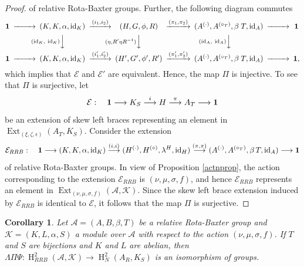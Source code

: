 \documentclass[11pt]{amsart}
\theoremstyle{thrm}
\theoremstyle{plain}
\newtheorem{cor}[thm]{Corollary}
\theoremstyle{definition}
\newcommand{\Ho}{\operatorname{H} }
\newcommand{\Id}{\operatorname{id}}
\newcommand{\Ext}{\operatorname{Ext} }
\numberwithin{equation}{section}
\begin{document}
\begin{proof}
of relative Rota-Baxter groups.  Further, the following diagram commutes 
		\begin{align}
			\begin{CD}\label{eqact1}
				{\bf 1} @>>> (K,K,\alpha,\Id_K) @>(i_1, i_2)>> (H,G, \phi, R) @>{{(\pi_1, \pi_2)} }>> (A^{(\cdot)},A^{(\circ_T)}, \beta \; T, \Id_A) @>>> {\bf 1}\\ 
				&& @V{(\Id_K, ~\Id_K)} VV@V{(\eta, R^\prime \eta R^{-1})} VV @V{(\Id_A, ~\Id_A)}VV \\
				{\bf 1} @>>> (K,K,\alpha,\Id_K) @>(i^\prime_1, i^\prime_2)>>(H^\prime,G^\prime, \phi^\prime, R^\prime) @>{(\pi^\prime_1, \pi^\prime_2) }>> (A^{(\cdot)},A^{(\circ_T)}, \beta \; T, \Id_A) @>>> {\bf 1},
			\end{CD}
		\end{align}
which implies that $\mathcal{E}$ and $\mathcal{E}'$ are equivalent. Hence, the map $\Pi$ is injective. To see that $\Pi$ is surjective, let $$\mathcal{E}: \quad {\bf 1} \longrightarrow K_S \stackrel{i}{\longrightarrow}  H \stackrel{\pi}{\longrightarrow} A_T \longrightarrow {\bf 1}$$
be an extension of skew left braces representing an element in $ \Ext_{(\xi, \zeta, \epsilon)}(A_T, K_S)$. Consider the extension 
$$\mathcal{E}_{RRB} : \quad  {\bf 1} \longrightarrow (K, K, \alpha , \Id_K) \stackrel{(i, i)}{\longrightarrow}  (H^{(\cdot)}, H^{(\circ)}, \lambda^H, \Id_H) \stackrel{(\pi, \pi)}{\longrightarrow} (A^{(\cdot)}, A^{(\circ_T)}, \beta \, T, \Id_A) \longrightarrow {\bf 1}$$ of relative Rota-Baxter groups. In view of Proposition \ref{actnprop}, the action corresponding to the extension $\mathcal{E}_{RRB}$ is $(\nu, \mu, \sigma, f)$, and hence $\mathcal{E}_{RRB}$ represents an element in $ \Ext_{(\nu, \mu, \sigma, f)}(\mathcal{A}, \mathcal{K})$. Since the skew left brace extension induced by $\mathcal{E}_{RRB}$ is identical to $\mathcal{E}$, it follows that the map $\Pi$ is surjective. 
\end{proof}

\begin{cor}\label{isomorphism RRB and SLB cohomology}
Let $\mathcal{A}= (A,B, \beta, T)$ be a relative Rota-Baxter group and $\mathcal{K}=  (K,L,\alpha,S )$ a module over $\mathcal{A}$ with respect to the action $(\nu, \mu,\sigma, f)$. If $T$ and $S$ are bijections and $K$ and $L$ are abelian, then $\Lambda \Pi \Psi: \Ho^2_{RRB}(\mathcal{A}, \mathcal{K}) \to \Ho^2_N(A_R, K_S)$ is an isomorphism of groups.
\end{cor}
\end{document}
